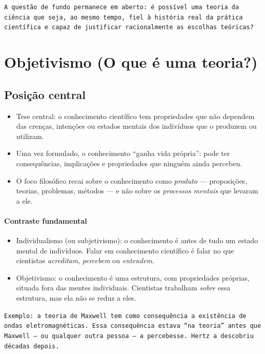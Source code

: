 \documentclass[9pt,a4paper]{extarticle}
\newcommand{\impt}[1]{\textcolor{important}{#1}}
\newcommand{\ntc}[1]{\textcolor{notice}{#1}}
\begin{document}
\texttt{A questão de fundo permanece em aberto: é possível uma teoria da ciência que seja, ao mesmo tempo, fiel à história real da prática científica e capaz de justificar racionalmente as escolhas teóricas?}

\section{Objetivismo (O que é uma teoria?)} 

\subsection{Posição central}

\begin{itemize}
    \item \ntc{Tese central}: o conhecimento científico tem propriedades que \impt{não dependem das crenças, intenções ou estados mentais dos indivíduos} que o produzem ou utilizam.
    \item Uma vez formulado, o conhecimento ``ganha vida própria'': pode ter consequências, implicações e propriedades que ninguém ainda percebeu.
    \item O foco filosófico recai sobre o conhecimento como \emph{produto} --- proposições, teorias, problemas, métodos --- e não sobre os \emph{processos mentais} que levaram a ele.
\end{itemize}

\paragraph{Contraste fundamental}

\begin{itemize}
    \item \ntc{Individualismo (ou subjetivismo)}: o conhecimento é antes de tudo um \impt{estado mental} de indivíduos. Falar em conhecimento científico é falar no que cientistas \emph{acreditam}, \emph{percebem} ou \emph{entendem}.
    \item \ntc{Objetivismo}: o conhecimento é uma \impt{estrutura}, com propriedades próprias, situada fora das mentes individuais. Cientistas trabalham \emph{sobre} essa estrutura, mas ela não se reduz a eles.
\end{itemize}

\texttt{Exemplo: a teoria de Maxwell tem como consequência a existência de ondas eletromagnéticas. Essa consequência estava ``na teoria'' antes que Maxwell --- ou qualquer outra pessoa --- a percebesse. Hertz a descobriu décadas depois.}
\end{document}
